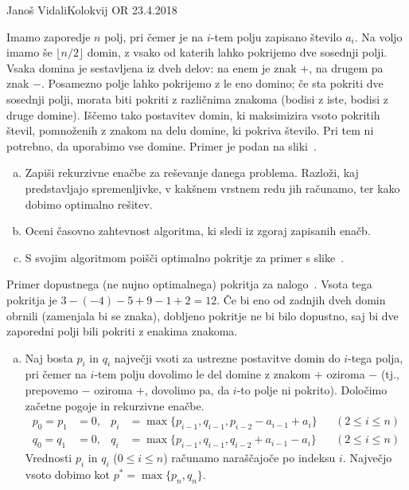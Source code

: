 \begin{naloga}{Janoš Vidali}{Kolokvij OR 23.4.2018}
\begin{vprasanje}
Imamo zaporedje $n$ polj,
pri čemer je na $i$-tem polju zapisano število $a_i$.
Na voljo imamo še $\lfloor n/2 \rfloor$ domin,
z vsako od katerih lahko pokrijemo dve sosednji polji.
Vsaka domina je sestavljena iz dveh delov:
na enem je znak $+$, na drugem pa znak $-$.
Posamezno polje lahko pokrijemo z le eno domino;
če sta pokriti dve sosednji polji, morata biti pokriti z različnima znakoma
(bodisi z iste, bodisi z druge domine).
Iščemo tako postavitev domin,
ki maksimizira vsoto pokritih števil,
pomnoženih z znakom na delu domine, ki pokriva število.
Pri tem ni potrebno, da uporabimo vse domine.
Primer je podan na sliki~\fig.

\begin{enumerate}[(a)]
\item Zapiši rekurzivne enačbe za reševanje danega problema.
Razloži, kaj pred\-stav\-lja\-jo spremenljivke,
v kakšnem vrstnem redu jih računamo,
ter kako dobimo optimalno rešitev.

\item Oceni časovno zahtevnost algoritma, ki sledi iz zgoraj zapisanih enačb.

\item S svojim algoritmom poišči optimalno pokritje
za primer s slike~\fig.
\end{enumerate}

\begin{slika}
\pgfslika
\caption{Primer dopustnega (ne nujno optimalnega) pokritja
za nalogo~\nal.
Vsota tega pokritja je $3 - (-4) - 5 + 9 - 1 + 2 = 12$.
Če bi eno od zadnjih dveh domin obrnili (zamenjala bi se znaka),
dobljeno pokritje ne bi bilo dopustno,
saj bi dve zaporedni polji bili pokriti z enakima znakoma.}
\end{slika}
\end{vprasanje}

\begin{odgovor}
\begin{enumerate}[(a)]
\item Naj bosta $p_i$ in $q_i$ največji vsoti
za ustrezne postavitve domin do $i$-tega polja,
pri čemer na $i$-tem polju dovolimo le del domine z znakom $+$ oziroma $-$
(tj., prepovemo $-$ oziroma $+$, dovolimo pa, da $i$-to polje ni pokrito).
Določimo začetne pogoje in rekurzivne enačbe.
\begin{align*}
p_0 = p_1 &= 0, &
p_i &= \max\{p_{i-1}, q_{i-1}, p_{i-2} - a_{i-1} + a_i\} && (2 \le i \le n) \\
q_0 = q_1 &= 0, &
q_i &= \max\{p_{i-1}, q_{i-1}, q_{i-2} + a_{i-1} - a_i\} && (2 \le i \le n)
\end{align*}
Vrednosti $p_i$ in $q_i$ ($0 \le i \le n$)
računamo naraščajoče po indeksu $i$.
Največjo vsoto dobimo kot $p^* = \max\{p_n, q_n\}$.


\end{enumerate}
\end{odgovor}
\end{naloga}
